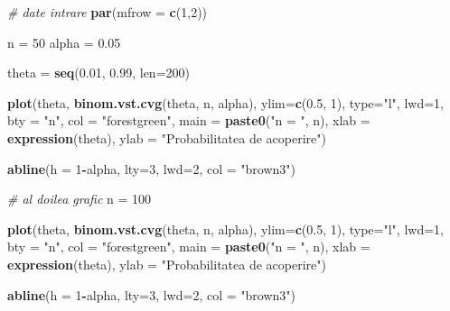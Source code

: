 \documentclass[]{article}
\newenvironment{Shaded}{\begin{snugshade}}{\end{snugshade}}
\newcommand{\KeywordTok}[1]{\textcolor[rgb]{0.13,0.29,0.53}{\textbf{#1}}}
\newcommand{\DataTypeTok}[1]{\textcolor[rgb]{0.13,0.29,0.53}{#1}}
\newcommand{\DecValTok}[1]{\textcolor[rgb]{0.00,0.00,0.81}{#1}}
\newcommand{\FloatTok}[1]{\textcolor[rgb]{0.00,0.00,0.81}{#1}}
\newcommand{\StringTok}[1]{\textcolor[rgb]{0.31,0.60,0.02}{#1}}
\newcommand{\CommentTok}[1]{\textcolor[rgb]{0.56,0.35,0.01}{\textit{#1}}}
\newcommand{\OperatorTok}[1]{\textcolor[rgb]{0.81,0.36,0.00}{\textbf{#1}}}
\newcommand{\NormalTok}[1]{#1}
\begin{document}
\begin{Shaded}
\begin{Highlighting}[]
\CommentTok{# date intrare}
\KeywordTok{par}\NormalTok{(}\DataTypeTok{mfrow =} \KeywordTok{c}\NormalTok{(}\DecValTok{1}\NormalTok{,}\DecValTok{2}\NormalTok{))}

\NormalTok{n =}\StringTok{ }\DecValTok{50}
\NormalTok{alpha =}\StringTok{ }\FloatTok{0.05}

\NormalTok{theta =}\StringTok{ }\KeywordTok{seq}\NormalTok{(}\FloatTok{0.01}\NormalTok{, }\FloatTok{0.99}\NormalTok{, }\DataTypeTok{len=}\DecValTok{200}\NormalTok{)}

\KeywordTok{plot}\NormalTok{(theta, }\KeywordTok{binom.vst.cvg}\NormalTok{(theta, n, alpha), }
     \DataTypeTok{ylim=}\KeywordTok{c}\NormalTok{(}\FloatTok{0.5}\NormalTok{, }\DecValTok{1}\NormalTok{), }\DataTypeTok{type=}\StringTok{"l"}\NormalTok{, }\DataTypeTok{lwd=}\DecValTok{1}\NormalTok{,}
     \DataTypeTok{bty =} \StringTok{"n"}\NormalTok{,}
     \DataTypeTok{col =} \StringTok{"forestgreen"}\NormalTok{, }
     \DataTypeTok{main =} \KeywordTok{paste0}\NormalTok{(}\StringTok{"n = "}\NormalTok{, n),}
     \DataTypeTok{xlab =} \KeywordTok{expression}\NormalTok{(theta), }
     \DataTypeTok{ylab =} \StringTok{"Probabilitatea de acoperire"}\NormalTok{)}

\KeywordTok{abline}\NormalTok{(}\DataTypeTok{h =} \DecValTok{1}\OperatorTok{-}\NormalTok{alpha, }\DataTypeTok{lty=}\DecValTok{3}\NormalTok{, }\DataTypeTok{lwd=}\DecValTok{2}\NormalTok{,}
       \DataTypeTok{col =} \StringTok{"brown3"}\NormalTok{)}

\CommentTok{# al doilea grafic}
\NormalTok{n =}\StringTok{ }\DecValTok{100}

\KeywordTok{plot}\NormalTok{(theta, }\KeywordTok{binom.vst.cvg}\NormalTok{(theta, n, alpha), }
     \DataTypeTok{ylim=}\KeywordTok{c}\NormalTok{(}\FloatTok{0.5}\NormalTok{, }\DecValTok{1}\NormalTok{), }\DataTypeTok{type=}\StringTok{"l"}\NormalTok{, }\DataTypeTok{lwd=}\DecValTok{1}\NormalTok{,}
     \DataTypeTok{bty =} \StringTok{"n"}\NormalTok{,}
     \DataTypeTok{col =} \StringTok{"forestgreen"}\NormalTok{, }
     \DataTypeTok{main =} \KeywordTok{paste0}\NormalTok{(}\StringTok{"n = "}\NormalTok{, n),}
     \DataTypeTok{xlab =} \KeywordTok{expression}\NormalTok{(theta), }
     \DataTypeTok{ylab =} \StringTok{"Probabilitatea de acoperire"}\NormalTok{)}

\KeywordTok{abline}\NormalTok{(}\DataTypeTok{h =} \DecValTok{1}\OperatorTok{-}\NormalTok{alpha, }\DataTypeTok{lty=}\DecValTok{3}\NormalTok{, }\DataTypeTok{lwd=}\DecValTok{2}\NormalTok{,}
       \DataTypeTok{col =} \StringTok{"brown3"}\NormalTok{)}
\end{Highlighting}
\end{Shaded}
\end{document}
